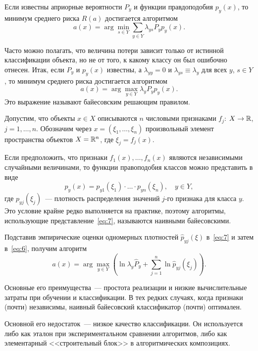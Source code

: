 Если известны априорные вероятности \( P_y \) и функции правдоподобия \( p_y(x) \), то минимум среднего
риска \( R(a) \) достигается алгоритмом
\begin{equation}
  a(x) = \arg\min_{s\in Y}\sum_{y\in Y}\lambda_{ys}P_yp_y(x).
  \label{eq:5}
\end{equation}

Часто можно полагать, что величина потери зависит только от истинной классификации объекта, но не от
того, к какому классу он был ошибочно отнесен. Итак, если \( P_y \) и \( p_y(x) \) известны, а
\( \lambda_{yy} = 0 \) и \( \lambda_{ys} \equiv \lambda_y \) для всех \( y \), \( s\in Y \), то минимум
среднего риска достигается алгоритмом
\begin{equation}
  a(x) = \arg\max_{y\in Y}\lambda_yP_yp_y(x).
  \label{eq:6}
\end{equation}
Это выражение называют байесовским решающим правилом.

Допустим, что объекты \( x\in X \) описываются \( n \) числовыми признаками \( f_j \):
\( X\to\mathbb{R} \), \( j = 1, \ldots, n \). Обозначим через \( x = (\xi_1, \ldots, \xi_n) \)
произвольный элемент пространства объектов \( X = \mathbb{R}^n \), где \( \xi_j = f_j(x) \).

Если предположить, что признаки \( f_1(x), \ldots, f_n(x) \) являются независимыми случайными
величинами, то функции правоподобия классов можно представить в виде
\begin{equation}
  p_y(x) = p_{y1}(\xi_1)\cdot\ldots\cdot p_{yn}(\xi_n), \quad y\in Y,
  \label{eq:7}
\end{equation}
где \( p_{yj}(\xi_j) \)~--- плотность распределения значений \( j \)-го признака для класса \( y \).
Это условие крайне редко выполняется на практике, поэтому алгоритмы, использующие
представление~\eqref{eq:7}, называются наивными байесовскими.

Подставив эмпирические оценки одномерных плотностей \( \hat{p}_{yj}(\xi) \) в~\eqref{eq:7} и затем
в~\eqref{eq:6}, получим алгоритм
\begin{equation}
  a(x) = \arg\max_{y\in Y}\left(\ln\lambda_y\hat{P}_y + \sum_{j = 1}^n \ln\hat{p}_{yj}(\xi_j)\right).
  \label{eq:8}
\end{equation}

Основные его преимущества~--- простота реализации и низкие вычислительные затраты при обучении и
классификации. В тех редких случаях, когда признаки (почти) независимы, наивный байесовский
классификатор (почти) оптимален.

Основной его недостаток~--- низкое качество классификации. Он используется либо как эталон при
экспериментальном сравнении алгоритмов, либо как элементарный <<строительный блок>> в алгоритмических
композициях.

